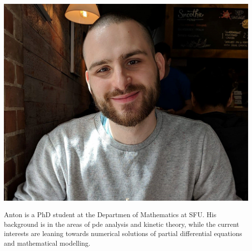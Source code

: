 \documentclass{beamer}
\begin{document}
\begin{frame}
\vspace{10pt}
\begin{minipage}[b]{0.15\textwidth}
\includegraphics[width=\textwidth, trim={70pt 170pt 70pt 100pt}, clip]{TeamPics/Noah.jpg}
\end{minipage}\hspace{0.05\textwidth}%
\begin{minipage}[b]{0.8\textwidth}
{\small Anton is a PhD student at the Departmen of Mathematics at SFU. His background is in the areas of pde analysis and kinetic theory, while the current interests are leaning towards numerical solutions of partial differential equations and mathematical modelling. }
\end{minipage}


\end{frame}
\end{document}
